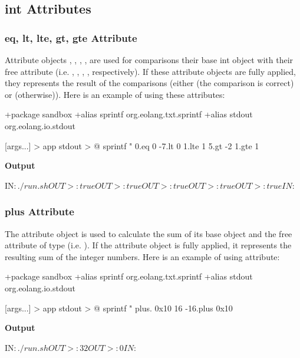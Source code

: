 \documentclass[12pt]{book}
\begin{document}
{\subsection{int Attributes}

\subsubsection{eq, lt, lte, gt, gte Attribute} \label{subsubsec:comp-attrs}
Attribute objects , , , ,  are used for comparisons their base int object with their  free attribute (i.e. , , , ,  respectively).
If these attribute objects are fully applied, they represents the result of the comparisons (either  (the comparison is correct) or  (otherwise)). Here is an example of using these attributes:

\begin{ffcode}
+package sandbox
+alias sprintf org.eolang.txt.sprintf
+alias stdout org.eolang.io.stdout

[args...] > app
  stdout > @
    sprintf
      "%
      0.eq 0
      -7.lt 0
      1.lte 1
      5.gt -2
      1.gte 1
\end{ffcode}
\textbf{Output}
\begin{ffcode}
IN$: ./run.sh
OUT>: true
OUT>: true
OUT>: true
OUT>: true
OUT>: true
IN$: 
\end{ffcode}

\subsubsection{plus Attribute} 
The  attribute object is used to calculate the sum of its base  object and the free attribute  of type  (i.e. ).
If the  attribute object is fully applied, it represents the resulting sum of the integer numbers. Here is an example of using  attribute:

\begin{ffcode}
+package sandbox
+alias sprintf org.eolang.txt.sprintf
+alias stdout org.eolang.io.stdout

[args...] > app
  stdout > @
    sprintf
      "%
      plus.
        0x10
        16
      -16.plus 0x10
\end{ffcode}
\textbf{Output} 
\begin{ffcode}
IN$: ./run.sh
OUT>: 32
OUT>: 0
IN$: 
\end{ffcode}

}
\end{document}
